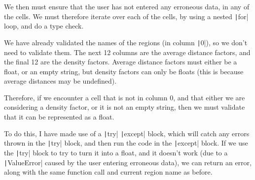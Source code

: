 \documentclass[12pt]{report}
\newcommand{\pil}[1]{\protect\texttt|#1|}
\begin{document}
We then must ensure that the user has not entered any erroneous data, in any of the cells. We must therefore iterate over each of the cells, by using a nested \pil{for} loop, and do a type check.

We have already validated the names of the regions (in column \pil{0}), so we don't need to validate them. The next 12 columns are the average distance factors, and the final 12 are the density factors. Average distance factors must either be a float, or an empty string, but density factors can only be floats (this is because average distances may be undefined).

Therefore, if we encounter a cell that is not in column 0, and that either we are considering a density factor, or it is not an empty string, then we must validate that it can be represented as a float.

To do this, I have made use of a \pil{try} \pil{except} block, which will catch any errors thrown in the \pil{try} block, and then run the code in the \pil{except} block. If we use the \pil{try} block to try to turn it into a float, and it doesn't work (due to a \pil{ValueError} caused by the user entering erroneous data), we can return an error, along with the same function call and current region name as before.
\end{document}
